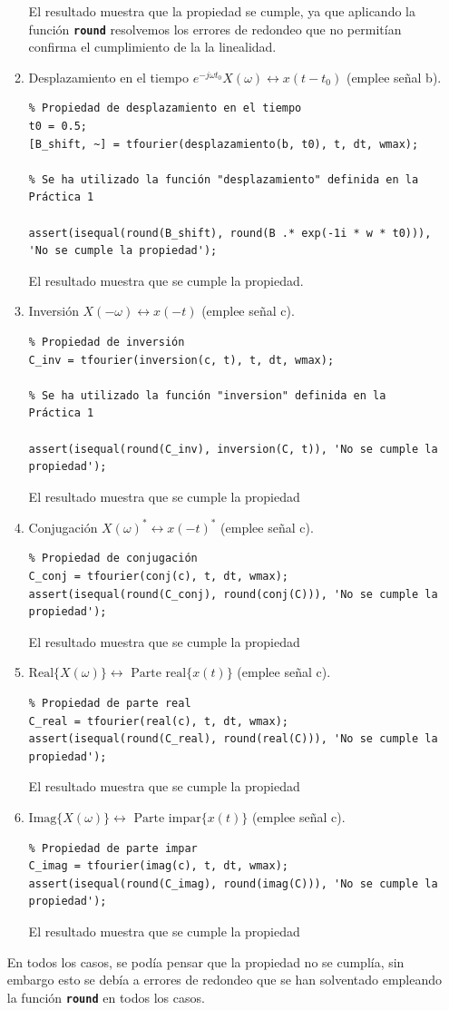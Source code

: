 \documentclass{article}
\newcommand{\code}[1]{\texttt{\textbf{#1}}}
\begin{document}
\begin{enumerate}[leftmargin=*]
\begin{enumerate}[label=\roman*)]
El resultado muestra que la propiedad se cumple, ya que aplicando la función \code{round} resolvemos los errores de redondeo que no permitían confirma el cumplimiento de la la linealidad.
\item Desplazamiento en el tiempo $e^{-j\omega t_0}X(\omega)\longleftrightarrow x(t-t_0)$ (emplee señal b).
\begin{lstlisting}
% Propiedad de desplazamiento en el tiempo
t0 = 0.5;
[B_shift, ~] = tfourier(desplazamiento(b, t0), t, dt, wmax);

% Se ha utilizado la función "desplazamiento" definida en la Práctica 1

assert(isequal(round(B_shift), round(B .* exp(-1i * w * t0))), 'No se cumple la propiedad');
\end{lstlisting}
El resultado muestra que se cumple la propiedad. 
\item Inversión $X(-\omega)\longleftrightarrow x(-t)$ (emplee señal c).
\begin{lstlisting}
% Propiedad de inversión
C_inv = tfourier(inversion(c, t), t, dt, wmax);

% Se ha utilizado la función "inversion" definida en la Práctica 1

assert(isequal(round(C_inv), inversion(C, t)), 'No se cumple la propiedad');
\end{lstlisting}
El resultado muestra que se cumple la propiedad
\item Conjugación $X(\omega)^*\longleftrightarrow x(-t)^*$ (emplee señal c).

\begin{lstlisting}
% Propiedad de conjugación
C_conj = tfourier(conj(c), t, dt, wmax);
assert(isequal(round(C_conj), round(conj(C))), 'No se cumple la propiedad');
\end{lstlisting}
El resultado muestra que se cumple la propiedad
\item $\mathrm{Real}\{X(\omega)\}\longleftrightarrow\text{ Parte real}\{x(t)\}$ (emplee señal c).

\begin{lstlisting}
% Propiedad de parte real
C_real = tfourier(real(c), t, dt, wmax);
assert(isequal(round(C_real), round(real(C))), 'No se cumple la propiedad');
\end{lstlisting}
El resultado muestra que se cumple la propiedad
\item $\mathrm{Imag}\{X(\omega)\}\longleftrightarrow\text{ Parte impar}\{x(t)\}$ (emplee señal c).

\begin{lstlisting}
% Propiedad de parte impar
C_imag = tfourier(imag(c), t, dt, wmax);
assert(isequal(round(C_imag), round(imag(C))), 'No se cumple la propiedad');
\end{lstlisting}
El resultado muestra que se cumple la propiedad
\end{enumerate}

En todos los casos, se podía pensar que la propiedad no se cumplía, sin embargo esto se debía a errores de redondeo que se han solventado empleando la función \code{round} en todos los casos.
\end{enumerate}
\end{document}
